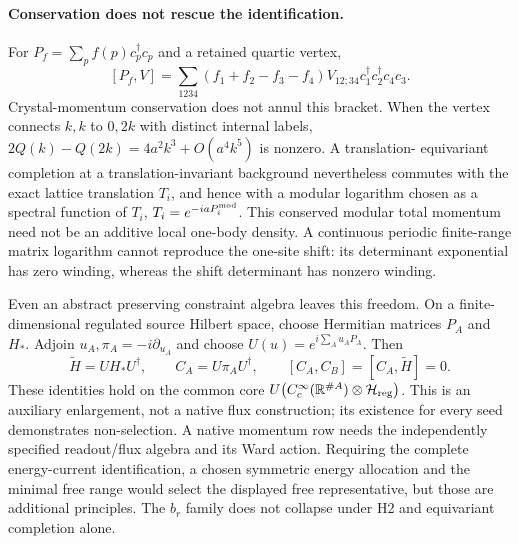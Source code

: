 \documentclass[10pt]{article}
\begin{document}
\paragraph{Conservation does not rescue the identification.}
For $P_f=\sum_pf(p)c_p^\dagger c_p$ and a retained quartic vertex,
\[
 [P_f,V]=\sum_{1234}(f_1+f_2-f_3-f_4)
 V_{12;34}c_1^\dagger c_2^\dagger c_4c_3.
\]
Crystal-momentum conservation does not annul this bracket. When
the vertex connects $k,k$ to $0,2k$ with distinct internal labels,
$2Q(k)-Q(2k)=4a^2k^3+O(a^4k^5)$ is nonzero. A translation-
equivariant completion at a translation-invariant background
nevertheless commutes with the exact lattice translation $T_i$,
and hence with a modular logarithm chosen as a spectral function of $T_i$,
$T_i=e^{-iaP_i^{\rm mod}}$. This conserved modular total momentum
need not be an additive local one-body density. A continuous
periodic finite-range matrix logarithm cannot reproduce the
one-site shift: its determinant exponential has zero winding,
whereas the shift determinant has nonzero winding.

Even an abstract preserving constraint algebra leaves this freedom.
On a finite-dimensional regulated source Hilbert space, choose
Hermitian matrices $P_A$ and $H_*$. Adjoin
$u_A,\pi_A=-i\partial_{u_A}$ and choose
$U(u)=e^{i\sum_Au_AP_A}$. Then
\[
 \widetilde H=UH_*U^\dagger,\qquad C_A=U\pi_AU^\dagger,
\qquad[C_A,C_B]=[C_A,\widetilde H]=0.
\]
These identities hold on the common core
$U\bigl(C_c^\infty(\mathbb R^{\#A})\otimes\mathcal H_{\rm reg}\bigr)$.
This is an auxiliary enlargement, not a native flux construction;
its existence for every seed demonstrates non-selection. A native
momentum row needs the independently specified readout/flux algebra
and its Ward action. Requiring the complete energy-current
identification, a chosen symmetric energy allocation and the
minimal free range would select the displayed free representative,
but those are additional principles. The $b_r$ family does not
collapse under H2 and equivariant completion alone.
\end{document}
